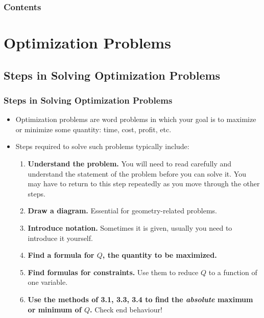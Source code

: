 \documentclass[serif,ignorenonframetext]{beamer}
\title{\commonTitleZeroThreeSeven}
\subtitle{\commonSubtitleZeroThreeSeven}
\author{\commonAuthor}
\institute{\commonInstitute}
\date{\commonDateZeroThreeSeven}
\begin{document}

\begin{frame}
  \titlepage
\end{frame}

\begin{frame}
  \frametitle{Contents}
  \tableofcontents
\end{frame}


\section{Optimization Problems}

\subsection{Steps in Solving Optimization Problems}

\begin{frame}
  \frametitle{Steps in Solving Optimization Problems}
  \begin{itemize}[<+->]
  \item Optimization problems are word problems in which your goal is
    to maximize or minimize some quantity: time, cost, profit, etc.
  \item Steps required to solve such problems typically include:
    \begin{enumerate}[<+->]
    \item \textbf{Understand the problem.}  You will need to read carefully and
      understand the statement of the problem before you can solve it.  You
      may have to return to this step repeatedly as you move through the other
      steps.
    \item \textbf{Draw a diagram.}  Essential for geometry-related problems.
    \item \textbf{Introduce notation.}  Sometimes it is given, usually you
      need to introduce it yourself.
    \item \textbf{Find a formula for $Q$, the quantity to be maximized.}
    \item \textbf{Find formulas for constraints.}  Use them to reduce $Q$
      to a function of one variable.
    \item \textbf{Use the methods of 3.1, 3.3, 3.4 to find the 
      \textit{absolute} maximum or minimum of $Q$.}  Check end behaviour!
    \end{enumerate}
  \end{itemize}
\end{frame}
\end{document}
